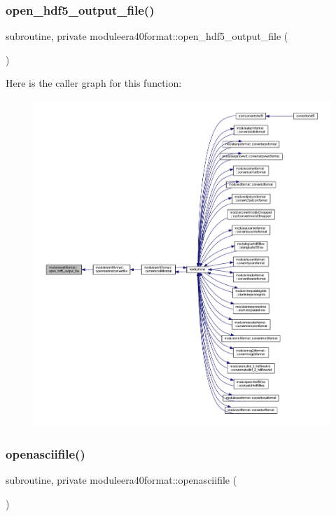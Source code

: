 \subsubsection{\texorpdfstring{open\+\_\+hdf5\+\_\+output\+\_\+file()}{open\_hdf5\_output\_file()}}
{\footnotesize\ttfamily subroutine, private moduleera40format\+::open\+\_\+hdf5\+\_\+output\+\_\+file (\begin{DoxyParamCaption}{ }\end{DoxyParamCaption})\hspace{0.3cm}{\ttfamily [private]}}

Here is the caller graph for this function\+:\nopagebreak
\begin{figure}[H]
\begin{center}
\leavevmode
\includegraphics[width=350pt]{namespacemoduleera40format_a84aefcd4351fc116d22a21fdfce2ec4f_icgraph}
\end{center}
\end{figure}
\mbox{\label{namespacemoduleera40format_aeaa93e0eaf981081d8b6a42b94714211}} 
\subsubsection{\texorpdfstring{openasciifile()}{openasciifile()}}
{\footnotesize\ttfamily subroutine, private moduleera40format\+::openasciifile (\begin{DoxyParamCaption}{ }\end{DoxyParamCaption})\hspace{0.3cm}{\ttfamily [private]}}

